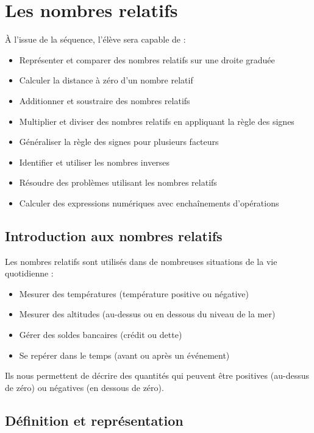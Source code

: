 \chapter{Les nombres relatifs}

\begin{objectifsbox}
À l'issue de la séquence, l'élève sera capable de :
\begin{itemize}
\item Représenter et comparer des nombres relatifs sur une droite graduée
\item Calculer la distance à zéro d'un nombre relatif
\item Additionner et soustraire des nombres relatifs
\item Multiplier et diviser des nombres relatifs en appliquant la règle des signes
\item Généraliser la règle des signes pour plusieurs facteurs
\item Identifier et utiliser les nombres inverses
\item Résoudre des problèmes utilisant les nombres relatifs
\item Calculer des expressions numériques avec enchaînements d'opérations
\end{itemize}
\end{objectifsbox}

\section{Introduction aux nombres relatifs}

Les nombres relatifs sont utilisés dans de nombreuses situations de la vie quotidienne :
\begin{itemize}[label = \textbullet]
\item Mesurer des températures (température positive ou négative)
\item Mesurer des altitudes (au-dessus ou en dessous du niveau de la mer)
\item Gérer des soldes bancaires (crédit ou dette)
\item Se repérer dans le temps (avant ou après un événement)
\end{itemize}

Ils nous permettent de décrire des quantités qui peuvent être positives (au-dessus de zéro) ou négatives (en dessous de zéro).

\section{Définition et représentation}

